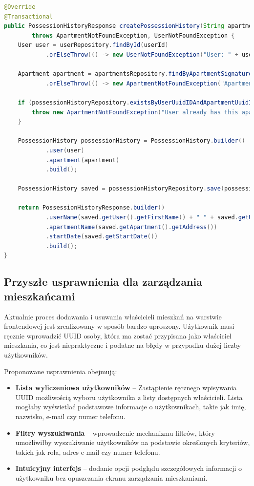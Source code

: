 \begin{lstlisting}[language=Java, caption=Przypisywanie mieszkańców w \texttt{ApartmentsServiceImp}]
@Override
@Transactional
public PossessionHistoryResponse createPossessionHistory(String apartmentSignature, UUID userId)
        throws ApartmentNotFoundException, UserNotFoundException {
    User user = userRepository.findById(userId)
            .orElseThrow(() -> new UserNotFoundException("User: " + userId + " not found"));

    Apartment apartment = apartmentsRepository.findByApartmentSignature(apartmentSignature)
            .orElseThrow(() -> new ApartmentNotFoundException("Apartment with signature: " + apartmentSignature + " not found"));

    if (possessionHistoryRepository.existsByUserUuidIDAndApartmentUuidID(userId, apartment.getUuidID())) {
        throw new ApartmentNotFoundException("User already has this apartment assigned");
    }

    PossessionHistory possessionHistory = PossessionHistory.builder()
            .user(user)
            .apartment(apartment)
            .build();

    PossessionHistory saved = possessionHistoryRepository.save(possessionHistory);

    return PossessionHistoryResponse.builder()
            .userName(saved.getUser().getFirstName() + " " + saved.getUser().getLastName())
            .apartmentName(saved.getApartment().getAddress())
            .startDate(saved.getStartDate())
            .build();
}
\end{lstlisting}

\subsection{Przyszłe usprawnienia dla zarządzania mieszkańcami}

Aktualnie proces dodawania i usuwania właścicieli mieszkań na warstwie frontendowej jest zrealizowany w sposób bardzo uproszony. Użytkownik musi ręcznie wprowadzić UUID osoby, która ma zostać przypisana jako właściciel mieszkania, co jest niepraktyczne i podatne na błędy w przypadku dużej liczby użytkowników.

Proponowane usprawnienia obejmują:

\begin{itemize}
    \item \textbf{Lista wyliczeniowa użytkowników} -- Zastąpienie ręcznego wpisywania UUID możliwością wyboru użytkownika z listy dostępnych właścicieli. Lista mogłaby wyświetlać podstawowe informacje o użytkownikach, takie jak imię, nazwisko, e-mail czy numer telefonu.
    \item \textbf{Filtry wyszukiwania} -- wprowadzenie mechanizmu filtrów, który umożliwiłby wyszukiwanie użytkowników na podstawie określonych kryteriów, takich jak rola, adres e-mail czy numer telefonu.
    \item \textbf{Intuicyjny interfejs} -- dodanie opcji podglądu szczegółowych informacji o użytkowniku bez opuszczania ekranu zarządzania mieszkaniami.
\end{itemize}

